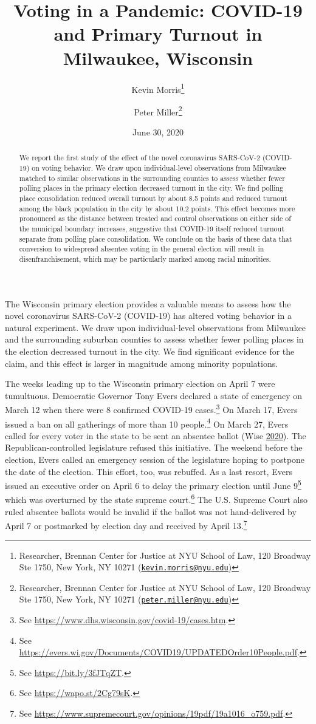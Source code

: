 \documentclass[
  12pt,
]{article}
\title{Voting in a Pandemic: COVID-19 and Primary Turnout in Milwaukee, Wisconsin}
\author{Kevin Morris\footnote{Researcher, Brennan Center for Justice at NYU School of Law, 120 Broadway Ste 1750, New York, NY 10271 (\href{mailto:kevin.morris@nyu.edu}{\nolinkurl{kevin.morris@nyu.edu}})} \and Peter Miller\footnote{Researcher, Brennan Center for Justice at NYU School of Law, 120 Broadway Ste 1750, New York, NY 10271 (\href{mailto:peter.miller@nyu.edu}{\nolinkurl{peter.miller@nyu.edu}})}}
\date{June 30, 2020}
\begin{document}
\maketitle
\begin{abstract}
We report the first study of the effect of the novel coronavirus SARS-CoV-2 (COVID-19) on voting behavior. We draw upon individual-level observations from Milwaukee matched to similar observations in the surrounding counties to assess whether fewer polling places in the primary election decreased turnout in the city. We find polling place consolidation reduced overall turnout by about 8.5 points and reduced turnout among the black population in the city by about 10.2 points. This effect becomes more pronounced as the distance between treated and control observations on either side of the municipal boundary increases, suggestive that COVID-19 itself reduced turnout separate from polling place consolidation. We conclude on the basis of these data that conversion to widespread absentee voting in the general election will result in disenfranchisement, which may be particularly marked among racial minorities.
\end{abstract}

\pagebreak

\doublespacing

The Wisconsin primary election provides a valuable means to assess how the novel coronavirus SARS-CoV-2 (COVID-19) has altered voting behavior in a natural experiment. We draw upon individual-level observations from Milwaukee and the surrounding suburban counties to assess whether fewer polling places in the election decreased turnout in the city. We find significant evidence for the claim, and this effect is larger in magnitude among minority populations.

The weeks leading up to the Wisconsin primary election on April 7 were tumultuous. Democratic Governor Tony Evers declared a state of emergency on March 12 when there were 8 confirmed COVID-19 cases.\footnote{See \url{https://www.dhs.wisconsin.gov/covid-19/cases.htm}.} On March 17, Evers issued a ban on all gatherings of more than 10 people.\footnote{See \url{https://evers.wi.gov/Documents/COVID19/UPDATEDOrder10People.pdf}.} On March 27, Evers called for every voter in the state to be sent an absentee ballot (Wise \protect\hyperlink{ref-Wise2020}{2020}). The Republican-controlled legislature refused this initiative. The weekend before the election, Evers called an emergency session of the legislature hoping to postpone the date of the election. This effort, too, was rebuffed. As a last resort, Evers issued an executive order on April 6 to delay the primary election until June 9\footnote{See \url{https://bit.ly/3fJTqZT}.} which was overturned by the state supreme court.\footnote{See \url{https://wapo.st/2Cg79sK}.} The U.S. Supreme Court also ruled absentee ballots would be invalid if the ballot was not hand-delivered by April 7 or postmarked by election day and received by April 13.\footnote{See \url{https://www.supremecourt.gov/opinions/19pdf/19a1016_o759.pdf}.}
\end{document}
